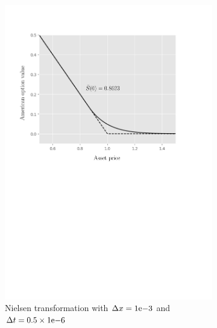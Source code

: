 \begin{figure}[H]
\begin{subfigure}{0.4\textwidth}
    \includegraphics[width=\textwidth]{chapters/chapter3/TestCase2NielsenExplicit.pdf}
    \caption{Nielsen transformation with $\Delta{x}={1}\mathrm{e}{-3}$ and $\Delta{t}=0.5\times{1}\mathrm{e}{-6}$}
  \end{subfigure}
  \begin{subfigure}{0.435\textwidth}
    \label{fig:finitedifferencesschemes:numericaresults:test_case_2_explicit_company}
    \centering

\end{subfigure}
\end{figure}
